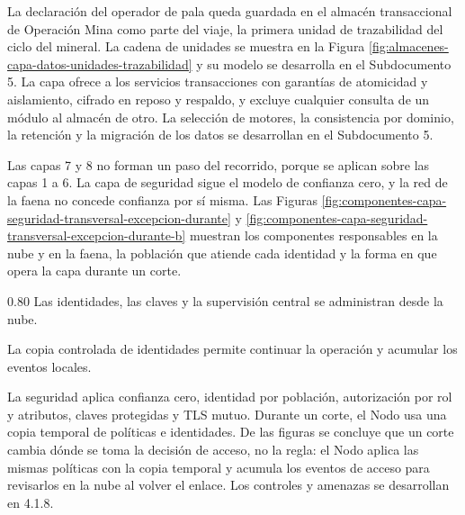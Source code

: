 \documentclass[subdoc]{../../comun/overfore}
\begin{document}
La declaración del operador de pala queda guardada en el almacén transaccional de Operación Mina como parte del viaje, la primera unidad de trazabilidad del ciclo del mineral. La cadena de unidades se muestra en la Figura \ref{fig:almacenes-capa-datos-unidades-trazabilidad} y su modelo se desarrolla en el Subdocumento 5. La capa ofrece a los servicios transacciones con garantías de atomicidad y aislamiento, cifrado en reposo y respaldo, y excluye cualquier consulta de un módulo al almacén de otro. La selección de motores, la consistencia por dominio, la retención y la migración de los datos se desarrollan en el Subdocumento 5.

Las capas 7 y 8 no forman un paso del recorrido, porque se aplican sobre las capas 1 a 6. La capa de seguridad sigue el modelo de confianza cero, y la red de la faena no concede confianza por sí misma. Las Figuras \ref{fig:componentes-capa-seguridad-transversal-excepcion-durante} y \ref{fig:componentes-capa-seguridad-transversal-excepcion-durante-b} muestran los componentes responsables en la nube y en la faena, la población que atiende cada identidad y la forma en que opera la capa durante un corte.

\begin{horizontal}
\expandafter\def\csname ov@altofig\endcsname{0.80}
\begingroup
\def\thefigure{4.8a}
\def\theHfigure{4.8a}
\endgroup
Las identidades, las claves y la supervisión central se administran desde la nube.

\clearpage
\addtocounter{figure}{-1}
\begingroup
\def\thefigure{4.8b}
\def\theHfigure{4.8b}
\endgroup
La copia controlada de identidades permite continuar la operación y acumular los eventos locales.

\end{horizontal}
La seguridad aplica confianza cero, identidad por población, autorización por rol y atributos, claves protegidas y TLS mutuo. Durante un corte, el Nodo usa una copia temporal de políticas e identidades. De las figuras se concluye que un corte cambia dónde se toma la decisión de acceso, no la regla: el Nodo aplica las mismas políticas con la copia temporal y acumula los eventos de acceso para revisarlos en la nube al volver el enlace. Los controles y amenazas se desarrollan en 4.1.8.
\end{document}
